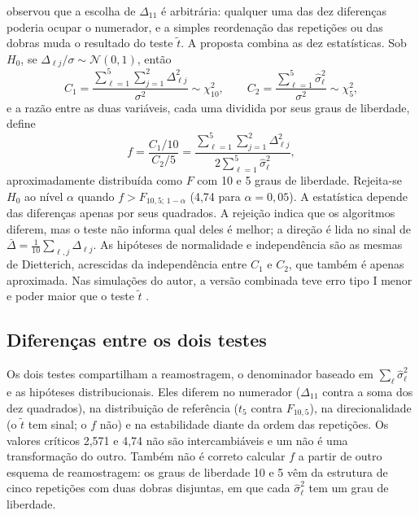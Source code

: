 \documentclass[11pt,a4paper]{article}
\begin{document}
\citet{alpaydin1999combined} observou que a escolha de $\Delta_{11}$ é arbitrária:
qualquer uma das dez diferenças poderia ocupar o numerador, e a simples
reordenação das repetições ou das dobras muda o resultado do teste $\tilde t$.
A proposta combina as dez estatísticas. Sob $H_0$, se $\Delta_{\ell j}/\sigma\sim
\mathcal{N}(0,1)$, então
\begin{equation}
  C_1=\frac{\sum_{\ell=1}^{5}\sum_{j=1}^{2}\Delta_{\ell j}^{2}}{\sigma^{2}}\sim\chi^{2}_{10},
  \qquad
  C_2=\frac{\sum_{\ell=1}^{5}\hat\sigma_\ell^{2}}{\sigma^{2}}\sim\chi^{2}_{5},
\end{equation}
e a razão entre as duas variáveis, cada uma dividida por seus graus de
liberdade, define
\begin{equation}
  f=\frac{C_1/10}{C_2/5}=\frac{\sum_{\ell=1}^{5}\sum_{j=1}^{2}\Delta_{\ell j}^{2}}{2\sum_{\ell=1}^{5}\hat\sigma_\ell^{2}},
  \label{eq:alpaydin}
\end{equation}
aproximadamente distribuída como $F$ com 10 e 5 graus de liberdade. Rejeita-se
$H_0$ ao nível $\alpha$ quando $f>F_{10,5;\,1-\alpha}$ (4,74 para
$\alpha=0{,}05$). A estatística depende das diferenças apenas por seus
quadrados. A rejeição indica que os algoritmos diferem, mas o teste não
informa qual deles é melhor; a direção é lida no sinal de $\bar\Delta=\frac1{10}
\sum_{\ell,j}\Delta_{\ell j}$. As hipóteses de normalidade e independência são as mesmas
de Dietterich, acrescidas da independência entre $C_1$ e $C_2$, que também é
apenas aproximada. Nas simulações do autor, a versão combinada teve erro tipo
I menor e poder maior que o teste $\tilde t$ \citep{alpaydin1999combined}.

\subsection{Diferenças entre os dois testes}

Os dois testes compartilham a reamostragem, o denominador baseado em
$\sum_\ell \hat\sigma_\ell^2$ e as hipóteses distribucionais. Eles diferem no numerador
($\Delta_{11}$ contra a soma dos dez quadrados), na distribuição de referência
($t_5$ contra $F_{10,5}$), na direcionalidade (o $\tilde t$ tem sinal; o $f$
não) e na estabilidade diante da ordem das repetições. Os valores críticos
2,571 e 4,74 não são intercambiáveis e um não é uma transformação do outro.
Também não é correto calcular $f$ a partir de outro esquema de reamostragem:
os graus de liberdade 10 e 5 vêm da estrutura de cinco repetições com duas
dobras disjuntas, em que cada $\hat\sigma_\ell^2$ tem um grau de liberdade.
\end{document}
